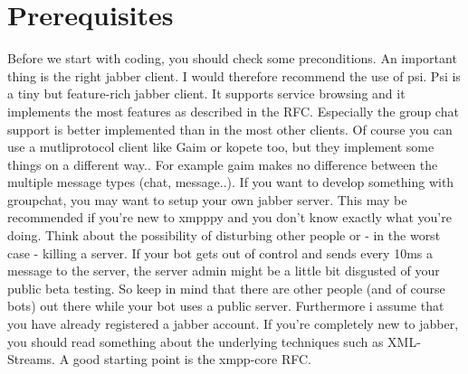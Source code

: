 \chapter{Prerequisites}

Before we start with coding, you should check some preconditions. An important thing is the right jabber client. I would therefore recommend the use of psi. Psi is a tiny but feature-rich jabber client. It supports service browsing and it implements the most features as described in the RFC. Especially the group chat support is better implemented than in the most other clients.
\newline
Of course you can use a mutliprotocol client like Gaim or kopete too, but they implement some things on a different way.. For example gaim makes no difference between the multiple message types (chat, message..).
\newline
\newline
If you want to develop something with groupchat, you may want to setup your own jabber server.
This may be recommended if you're new to xmpppy and you don't know exactly what you're doing.
Think about the possibility of disturbing other people or - in the worst case - killing a server.
If your bot gets out of control and sends every 10ms a message to the server, the server admin might be a little bit disgusted of your public beta testing. So keep in mind that there are other people (and of course bots) out there while your bot uses a public server.
\newline
\newline
Furthermore i assume that you have already registered a jabber account.
\newline
\newline
If you're completely new to jabber, you should read something about the underlying techniques such as XML-Streams. A good starting point is the xmpp-core RFC.